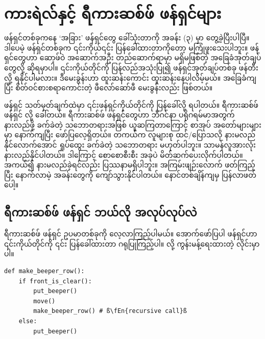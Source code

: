 \chapter{ကားရဲလ်နှင့် ရီကားဆစ်ဖ် ဖန်ရှင်များ}

ဖန်ရှင်တစ်ခုကနေ ‘အခြား’ ဖန်ရှင်တွေ ခေါ်သုံးတာကို အခန်း (၃) မှာ တွေ့ခဲ့ပြီးပါပြီ။ ဒါပေမဲ့ ဖန်ရှင်တစ်ခုက ၎င်းကိုယ်၎င်း ပြန်ခေါ်ထားတာကိုတော့ မကြုံဖူးသေးပါဘူး။ ဖန်ရှင်တွေဟာ ဆော့ဖ်ဝဲ အဆောက်အဦး တည်ဆောက်ရာမှာ မရှိမဖြစ်တဲ့ အခြေခံအုတ်ချပ်တွေလို့ ဆိုရမှာပါ။  ၎င်းကိုယ်တိုင်ကို ပြန်လည်အသုံးပြု၍ ဖန်ရှင်အုတ်ချပ်တစ်ခု ဖန်တီးလို့ ရနိုင်ပါမလား။ ဒီမေးခွန်းဟာ  ထူးဆန်းကောင်း ထူးဆန်းနေပါလိမ့်မယ်။ အခြေခံကျပြီး စိတ်ဝင်စားစရာကောင်းတဲ့ ဖီလော်ဆော်ဖီ မေးခွန်းလည်း ဖြစ်တယ်။



ဖန်ရှင် သတ်မှတ်ချက်ထဲမှာ ၎င်းဖန်ရှင်ကိုယ်တိုင်ကို ပြန်ခေါ်လို့ ရပါတယ်။ ရီကားဆစ်ဖ် ဖန်ရှင်  လို့ ခေါ်တယ်။ ရီကားဆစ်ဖ် ဖန်ရှင်တွေဟာ ဘီဂင်နာ ပရိုဂရမ်မာအတွက် နားလည်ဖို့ ခက်ခဲတဲ့ သဘောတရားအဖြစ် ယူဆကြတာကြောင့် စာအုပ် အတော်များများမှာ  နောက်ကျပြီး ဖော်ပြလေ့ရှိတယ်။ တကယ်က လူများစု ထင်/ပြောသလို နားမလည်နိုင်လောက်အောင် ရှုပ်ထွေး ခက်ခဲတဲ့ သဘောတရား မဟုတ်ပါဘူး။ သာမန်လူအားလုံး နားလည်နိုင်ပါတယ်။ ဒါကြောင့် စောစောစီးစီး အခုပဲ မိတ်ဆက်ပေးလိုက်ပါတယ်။ အကယ်၍ နားမလည်ခဲ့ရင်လည်း ပြဿနာမရှိပါဘူး။ အကြမ်းဖျဉ်းလောက် ဖတ်ကြည့်ပြီး နောက်လာမဲ့ အခန်းတွေကို ကျော်သွားနိုင်ပါတယ်။ နောင်တစ်ချိန်ကျမှ ပြန်လာဖတ်ပေါ့။

\section{ရီကားဆစ်ဖ် ဖန်ရှင် ဘယ်လို အလုပ်လုပ်လဲ}
 ရီကားဆစ်ဖ် ဖန်ရှင် ဥပမာတစ်ခုကို လေ့လာကြည့်ပါမယ်။ အောက်ဖော်ပြပါ ဖန်ရှင်ဟာ  ၎င်းကိုယ်တိုင်ကို ၎င်း ပြန်ခေါ်ထားတာ ဂရုပြုကြည့်ပါ။  လို့ ကွန်းမန့်ရေးထားတဲ့ လိုင်းမှာပါ။
%
\setlength{\fboxsep}{0pt}
\begin{verbatim}
def make_beeper_row():
    if front_is_clear():
        put_beeper()
        move()
        make_beeper_row() # ß\fEn{recursive call}ß
    else:
        put_beeper()
\end{verbatim}
%

